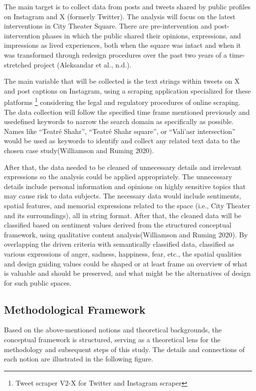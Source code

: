 \documentclass[
  letterpaper,
  DIV=11,
  numbers=noendperiod]{scrartcl}
\begin{document}
The main target is to collect data from posts and tweets shared by
public profiles on Instagram and X (formerly Twitter). The analysis will
focus on the latest interventions in City Theater Square. There are
pre-intervention and post-intervention phases in which the public shared
their opinions, expressions, and impressions as lived experiences, both
when the square was intact and when it was transformed through redesign
procedures over the past two years of a time-stretched project
(Aleksandar et al., n.d.).

The main variable that will be collected is the text strings within
tweets on X and post captions on Instagram, using a scraping application
specialized for these platforms \footnote{Tweet scraper V2-X for Twitter
  and Instagram scraper} considering the legal and regulatory procedures
of online scraping. The data collection will follow the specified time
frame mentioned previously and usedefined keywords to narrow the search
domain as specifically as possible. Names like ``Teatré Shahr'',
``Teatré Shahr square'', or ``Vali'asr intersection'' would be used as
keywords to identify and collect any related text data to the chosen
case study(Williamson and Ruming 2020).

After that, the data needed to be cleaned of unnecessary details and
irrelevant expressions so the analysis could be applied appropriately.
The unnecessary details include personal information and opinions on
highly sensitive topics that may cause risk to data subjects. The
necessary data would include sentiments, spatial features, and memorial
expressions related to the space (i.e., City Theater and its
surroundings), all in string format. After that, the cleaned data will
be classified based on sentiment values derived from the structured
conceptual framework, using qualitative content analysis(Williamson and
Ruming 2020). By overlapping the driven criteria with semantically
classified data, classified as various expressions of anger, sadness,
happiness, fear, etc., the spatial qualities and design guiding values
could be shaped or at least frame an overview of what is valuable and
should be preserved, and what might be the alternatives of design for
such public spaces.

\subsection{Methodological Framework}\label{methodological-framework}

Based on the above-mentioned notions and theoretical backgrounds, the
conceptual framework is structured, serving as a theoretical lens for
the methodology and subsequent steps of this study. The details and
connections of each notion are illustrated in the following figure.
\end{document}
